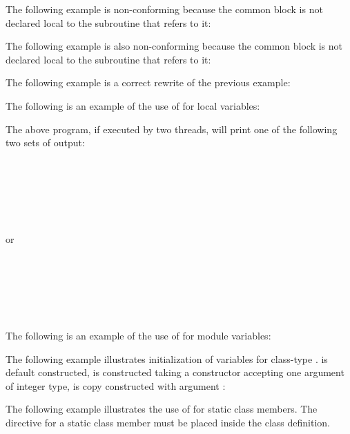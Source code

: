 \begin{fortranspecific}
The following example is non-conforming because the common block is not declared 
local to the subroutine that refers to it:


The following example is also non-conforming because the common block is not declared 
local to the subroutine that refers to it:


The following example is a correct rewrite of the previous example:


The following is an example of the use of  for local variables:


The above program, if executed by two threads, will print one of the following 
two sets of output: 

\\
\\

\\
\\

or

\\
\\

\\
\\

The following is an example of the use of  for module variables:

\end{fortranspecific}

\begin{cppspecific}
The following example illustrates initialization of  variables 
for class-type .  is default constructed,  is constructed 
taking a constructor accepting one argument of integer type,  is copy 
constructed with argument :


The following example illustrates the use of  for static 
class members. The  directive for a static class member must 
be placed inside the class definition.

\end{cppspecific}

